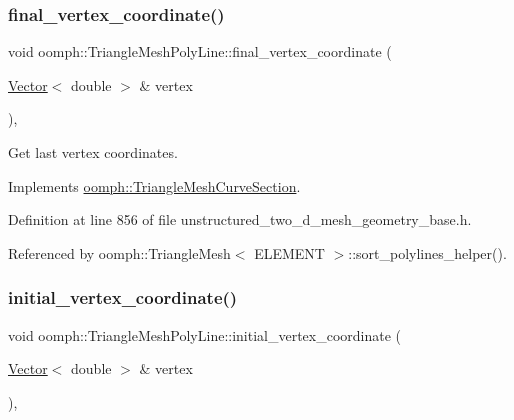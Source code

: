 \mbox{\label{classoomph_1_1TriangleMeshPolyLine_a6a110bac1436632fc4206eec2a96f8f4}} 
\subsubsection{\texorpdfstring{final\+\_\+vertex\+\_\+coordinate()}{final\_vertex\_coordinate()}}
{\footnotesize\ttfamily void oomph\+::\+Triangle\+Mesh\+Poly\+Line\+::final\+\_\+vertex\+\_\+coordinate (\begin{DoxyParamCaption}\item[{\hyperlink{classoomph_1_1Vector}{Vector}$<$ double $>$ \&}]{vertex }\end{DoxyParamCaption})\hspace{0.3cm}{\ttfamily [inline]}, {\ttfamily [virtual]}}



Get last vertex coordinates. 



Implements \hyperlink{classoomph_1_1TriangleMeshCurveSection_aa5bbea1d7c1157f25d3b93101ac4b80f}{oomph\+::\+Triangle\+Mesh\+Curve\+Section}.



Definition at line 856 of file unstructured\+\_\+two\+\_\+d\+\_\+mesh\+\_\+geometry\+\_\+base.\+h.



Referenced by oomph\+::\+Triangle\+Mesh$<$ E\+L\+E\+M\+E\+N\+T $>$\+::sort\+\_\+polylines\+\_\+helper().

\mbox{\label{classoomph_1_1TriangleMeshPolyLine_ac5970458ab4954408d512495c003e5f0}} 
\subsubsection{\texorpdfstring{initial\+\_\+vertex\+\_\+coordinate()}{initial\_vertex\_coordinate()}}
{\footnotesize\ttfamily void oomph\+::\+Triangle\+Mesh\+Poly\+Line\+::initial\+\_\+vertex\+\_\+coordinate (\begin{DoxyParamCaption}\item[{\hyperlink{classoomph_1_1Vector}{Vector}$<$ double $>$ \&}]{vertex }\end{DoxyParamCaption})\hspace{0.3cm}{\ttfamily [inline]}, {\ttfamily [virtual]}}




